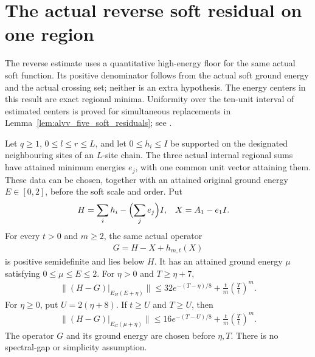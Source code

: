 \section{The actual reverse soft residual on one region}
\label{sec:alvv_reverse_soft_residual}

The reverse estimate uses a quantitative high-energy floor for the same
actual soft function. Its positive denominator follows from the actual
soft ground energy and the actual crossing set; neither is an extra
hypothesis. The energy centers in this result are exact regional minima.
Uniformity over the ten-unit interval of estimated centers is proved for
simultaneous replacements in Lemma~\ref{lem:alvv_five_soft_residuals}; see \cite{gap:alvv16_soft_regional_residuals}.

\begin{lemma}
    \label{lem:alvv_two_sided_soft_residuals}
    \leanok
    Let $q\geq1$, $0\leq l\leq r\leq L$, and let $0\leq h_i\leq I$
    be supported on the designated neighbouring sites of an $L$-site
    chain. The three actual internal regional sums have attained minimum
    energies $e_j$, with one common unit vector attaining them.
    These data can be chosen, together with an attained original ground
    energy $E\in[0,2]$, before the soft scale and order. Put
    \begin{align}
        H & =\sum_i h_i-\Bigl(\sum_j e_j\Bigr)I, & X & =A_1-e_1I.
    \end{align}
    For every $t>0$ and $m\geq2$, the same actual operator
    \begin{align}
        G=H-X+h_{m,t}(X)
    \end{align}
    is positive semidefinite and lies below $H$. It has an attained
    ground energy $\mu$ satisfying $0\leq\mu\leq E\leq2$.
    For $\eta>0$ and $T\geq\eta+7$,
    \begin{align}
        \|(H-G)|_{E_H(E+\eta)}\|
        \leq32e^{-(T-\eta)/8}+\frac{t}{m}\left(\frac Tt\right)^m.
    \end{align}
    For $\eta\geq0$, put $U=2(\eta+8)$. If $t\geq U$ and $T\geq U$,
    then
    \begin{align}
        \|(H-G)|_{E_G(\mu+\eta)}\|
        \leq16e^{-(T-U)/8}+\frac{t}{m}\left(\frac Tt\right)^m.
    \end{align}
    The operator $G$ and its ground energy are chosen before $\eta,T$.
    There is no spectral-gap or simplicity assumption.
\end{lemma}
